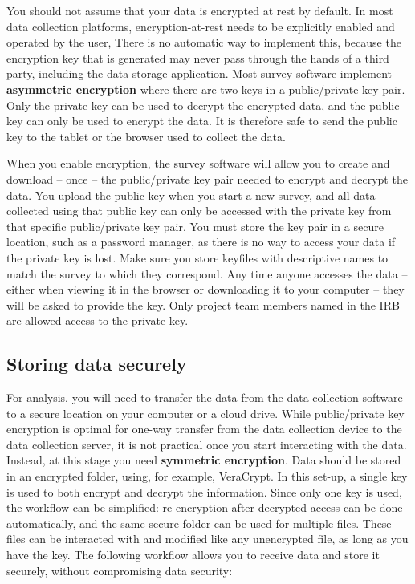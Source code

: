 You should not assume that your data is encrypted at rest by default.
In most data collection platforms,
encryption-at-rest needs to be explicitly enabled and operated by the user,
There is no automatic way to implement this,
because the encryption key that is generated may
never pass through the hands of a third party,
including the data storage application.
Most survey software implement \textbf{asymmetric encryption}
where there are two keys in a public/private key pair.
Only the private key can be used to decrypt the encrypted data,
and the public key can only be used to encrypt the data.
It is therefore safe to send the public key
to the tablet or the browser used to collect the data.

When you enable encryption, the survey software will allow you to create and
download -- once -- the public/private key pair needed to encrypt and decrypt the data.
You upload the public key when you start a new survey, and all data collected using that
public key can only be accessed with the private key from that specific public/private key pair.
You must store the key pair in a secure location, such as a password manager,
as there is no way to access your data if the private key is lost.
Make sure you store keyfiles with descriptive names to match the survey to which they correspond.
Any time anyone accesses the data --
either when viewing it in the browser or downloading it to your computer --
they will be asked to provide the key.
Only project team members named in the IRB are allowed access to the private key.

\subsection{Storing data securely}
For analysis, you will need to transfer the data from the data collection software to
a secure location on your computer or a cloud drive.
While public/private key encryption is optimal for one-way transfer
from the data collection device to the data collection server,
it is not practical once you start interacting with the data.
Instead, at this stage you need \textbf{symmetric encryption}.
Data should be stored in an encrypted folder,
using, for example, VeraCrypt.
In this set-up, a single key is used to both encrypt and decrypt the information.
Since only one key is used, the workflow can be simplified:
re-encryption after decrypted access can be done automatically,
and the same secure folder can be used for multiple files.
These files can be interacted with and modified like any unencrypted file,
 as long as you have the key.
The following workflow allows you to receive data and store it securely,
without compromising data security:

